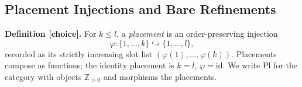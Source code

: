 
\subsection{Placement Injections and Bare Refinements}

\textbf{Definition [choice].}  For \(k\le l\), a \emph{placement} is an
order-preserving injection
\[
  \varphi:\{1,\dots,k\}\hookrightarrow\{1,\dots,l\},
\]
recorded as its strictly increasing slot list
\((\varphi(1),\dots,\varphi(k))\).  Placements compose as functions; the
identity placement is \(k=l\), \(\varphi=\mathrm{id}\).  We write
\(\mathrm{Pl}\) for the category with objects \(\mathbb Z_{>0}\) and
morphisms the placements.

